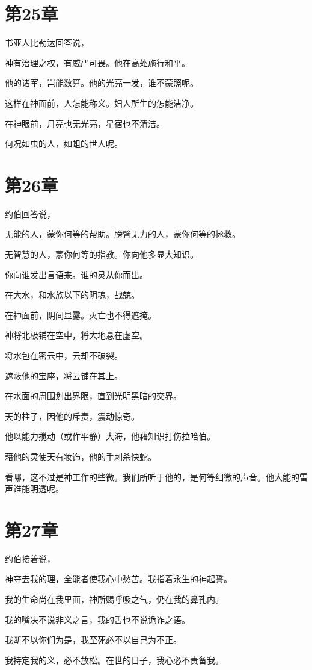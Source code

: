 \documentclass[12pt,oneside]{book}
\begin{document}
\chapter{第25章}
书亚人比勒达回答说，

神有治理之权，有威严可畏。他在高处施行和平。

他的诸军，岂能数算。他的光亮一发，谁不蒙照呢。

这样在神面前，人怎能称义。妇人所生的怎能洁净。

在神眼前，月亮也无光亮，星宿也不清洁。

何况如虫的人，如蛆的世人呢。


\chapter{第26章}
约伯回答说，

无能的人，蒙你何等的帮助。膀臂无力的人，蒙你何等的拯救。

无智慧的人，蒙你何等的指教。你向他多显大知识。

你向谁发出言语来。谁的灵从你而出。

在大水，和水族以下的阴魂，战兢。

在神面前，阴间显露。灭亡也不得遮掩。

神将北极铺在空中，将大地悬在虚空。

将水包在密云中，云却不破裂。

遮蔽他的宝座，将云铺在其上。

在水面的周围划出界限，直到光明黑暗的交界。

天的柱子，因他的斥责，震动惊奇。

他以能力搅动（或作平静）大海，他藉知识打伤拉哈伯。

藉他的灵使天有妆饰，他的手刺杀快蛇。

看哪，这不过是神工作的些微。我们所听于他的，是何等细微的声音。他大能的雷声谁能明透呢。


\chapter{第27章}
约伯接着说，

神夺去我的理，全能者使我心中愁苦。我指着永生的神起誓。

我的生命尚在我里面，神所赐呼吸之气，仍在我的鼻孔内。

我的嘴决不说非义之言，我的舌也不说诡诈之语。

我断不以你们为是，我至死必不以自己为不正。

我持定我的义，必不放松。在世的日子，我心必不责备我。
\end{document}
